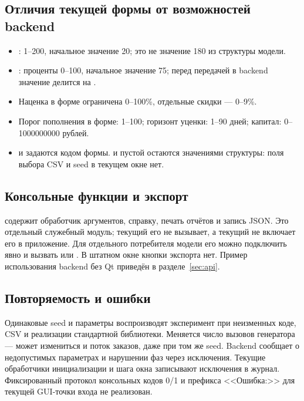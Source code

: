 \subsection{Отличия текущей формы от возможностей backend}
\begin{itemize}
  \item {}: 1--200, начальное значение 20; это не
        значение 180 из структуры модели.
  \item {}: проценты 0--100, начальное значение 75;
        перед передачей в backend значение делится на .
  \item Наценка в форме ограничена 0--100\%, отдельные скидки --- 0--9\%.
  \item Порог пополнения в форме: 1--100; горизонт уценки: 1--90 дней;
        капитал: 0--1000000000 рублей.
  \item {} и  задаются кодом формы.
         и пустой  остаются
        значениями структуры: поля выбора CSV и seed в текущем окне нет.
\end{itemize}

\subsection{Консольные функции и экспорт}
 содержит обработчик аргументов,
справку, печать отчётов и запись JSON. Это отдельный служебный модуль;
текущий  его не вызывает, а текущий 
не включает его в приложение.
Для отдельного потребителя модели его можно подключить явно и вызвать
 или
. В штатном окне кнопки экспорта нет.
Пример использования backend без Qt приведён в разделе~\ref{sec:api}.

\subsection{Повторяемость и ошибки}
Одинаковые seed и параметры воспроизводят эксперимент при неизменных коде,
CSV и реализации стандартной библиотеки. Меняется число вызовов генератора ---
может измениться и поток заказов, даже при том же seed.
Backend сообщает о недопустимых параметрах и нарушении фаз через исключения.
Текущие обработчики инициализации и шага окна записывают исключения в журнал.
Фиксированный протокол консольных кодов 0/1 и префикса <<Ошибка:>> для
текущей GUI-точки входа не реализован.
